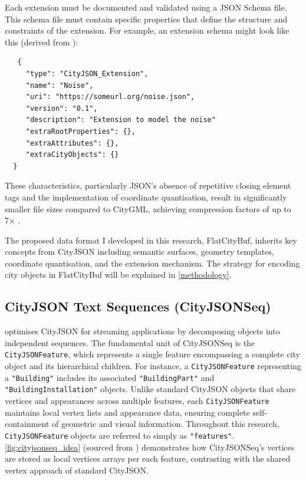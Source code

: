 Each extension must be documented and validated using a JSON Schema file. This schema file must contain specific properties that define the structure and constraints of the extension. For example, an extension schema might look like this (derived from \citet{ledoux_2019}):

\begin{lstlisting}
   {
     "type": "CityJSON_Extension",
     "name": "Noise",
     "uri": "https://someurl.org/noise.json",
     "version": "0.1",
     "description": "Extension to model the noise"
     "extraRootProperties": {},
     "extraAttributes": {},
     "extraCityObjects": {}
  }
\end{lstlisting}

These characteristics, particularly JSON's absence of repetitive closing element tags and the implementation of coordinate quantisation, result in significantly smaller file sizes compared to CityGML, achieving compression factors of up to 7× \citep{ledoux_2019}.

The proposed data format I developed in this research, FlatCityBuf, inherits key concepts from CityJSON including semantic surfaces, geometry templates, coordinate quantisation, and the extension mechanism. The strategy for encoding city objects in FlatCityBuf will be explained in \autoref{methodology}.

\subsection{CityJSON Text Sequences (CityJSONSeq)}
\label{rw:cityjson_enhancements:cityjsonseq}

\citet{ledoux_2024} optimises CityJSON for streaming applications by decomposing objects into independent sequences.
The fundamental unit of CityJSONSeq is the \texttt{CityJSONFeature}, which represents a single feature encompassing a complete city object and its hierarchical children. For instance, a \texttt{CityJSONFeature} representing a \texttt{"Building"} includes its associated \texttt{"BuildingPart"} and \texttt{"BuildingInstallation"} objects. Unlike standard CityJSON objects that share vertices and appearances across multiple features, each \texttt{CityJSONFeature} maintains local vertex lists and appearance data, ensuring complete self-containment of geometric and visual information. Throughout this research, \texttt{CityJSONFeature} objects are referred to simply as \texttt{"features"}. \autoref{fig:cityjsonseq_idea} (sourced from \citet{ledoux_2024}) demonstrates how CityJSONSeq's vertices are stored as local vertices arrays per each feature, contrasting with the shared vertex approach of standard CityJSON.

